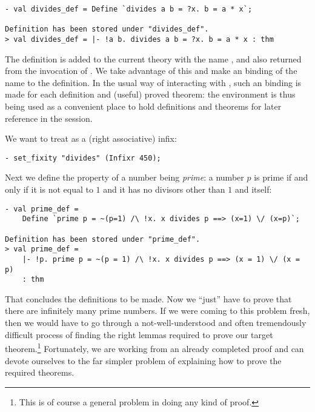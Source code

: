 \begin{session}
\begin{verbatim}
- val divides_def = Define `divides a b = ?x. b = a * x`;

Definition has been stored under "divides_def".
> val divides_def = |- !a b. divides a b = ?x. b = a * x : thm
\end{verbatim}
\end{session}

The definition is added to the current theory with the name
, and also returned from the invocation of
. We take advantage of this and make an \ML{} binding of
the name  to the definition. In the usual way of
interacting with \HOL, such an \ML{} binding is made for each
definition and (useful) proved theorem: the \ML{} environment is thus
being used as a convenient place to hold definitions and theorems for
later reference in the session.

We want to treat  as a (right associative) infix:
\begin{session}
\begin{verbatim}
- set_fixity "divides" (Infixr 450);
\end{verbatim}
\end{session}
Next we define the property of a number being \emph{prime}: a number $p$ is
prime if and only if it is not equal to $1$ and it has no divisors other
than $1$ and itself:

\begin{session}
\begin{verbatim}
- val prime_def =
    Define `prime p = ~(p=1) /\ !x. x divides p ==> (x=1) \/ (x=p)`;

Definition has been stored under "prime_def".
> val prime_def =
    |- !p. prime p = ~(p = 1) /\ !x. x divides p ==> (x = 1) \/ (x = p)
    : thm
\end{verbatim}
\end{session}

That concludes the definitions to be made. Now we ``just'' have to prove
that there are infinitely many prime numbers. If we were coming to this
problem fresh, then we would have to go through a not-well-understood
and often tremendously difficult process of finding the right lemmas
required to prove our target theorem.\footnote{This is of course a
general problem in doing any kind of proof.} Fortunately, we are working
from an already completed proof and can devote ourselves to the far
simpler problem of explaining how to prove the required theorems.


